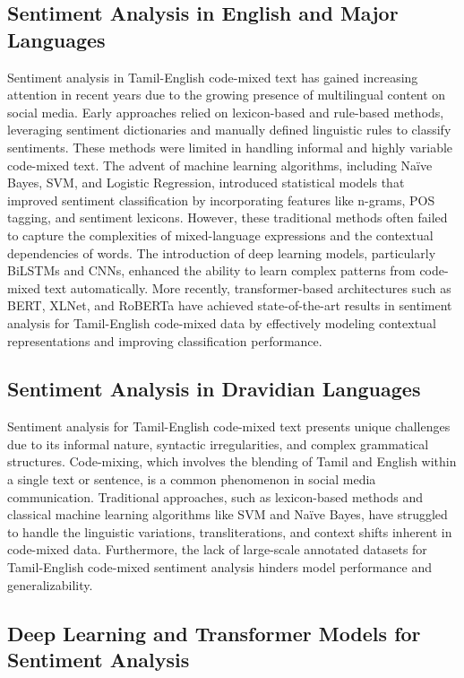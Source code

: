 \documentclass[11pt]{article}
\begin{document}
\subsection{Sentiment Analysis in English and Major Languages}
Sentiment analysis in Tamil-English code-mixed text has gained increasing attention in recent years due to the growing presence of multilingual content on social media. Early approaches relied on lexicon-based and rule-based methods, leveraging sentiment dictionaries and manually defined linguistic rules \citep{Alaparthi2020} to classify sentiments. These methods were limited in handling informal and highly variable code-mixed text. The advent of machine learning algorithms, including Naïve Bayes, SVM, and Logistic Regression, introduced statistical models that improved sentiment classification by incorporating features like n-grams, POS tagging, and sentiment lexicons. However, these traditional methods often failed to capture the complexities of mixed-language expressions and the contextual dependencies of words. The introduction of deep learning models, particularly BiLSTMs and CNNs, enhanced the ability to learn complex patterns from code-mixed text automatically. More recently, transformer-based architectures such as BERT, XLNet, and RoBERTa have achieved state-of-the-art results in sentiment analysis for Tamil-English code-mixed data by effectively modeling contextual representations and improving classification performance.

\subsection{Sentiment Analysis in Dravidian Languages}

Sentiment analysis for Tamil-English code-mixed text presents unique challenges due to its informal nature, syntactic irregularities, and complex grammatical structures. Code-mixing, which involves the blending of Tamil and English within a single text or sentence, is a common phenomenon in social media communication. Traditional approaches, such as lexicon-based methods and classical machine learning algorithms like SVM and Naïve Bayes, have struggled to handle the linguistic variations, transliterations, and context shifts inherent in code-mixed data. Furthermore, the lack of large-scale annotated datasets for Tamil-English code-mixed sentiment analysis hinders model performance and generalizability.

\subsection{Deep Learning and Transformer Models for Sentiment Analysis}
\end{document}
